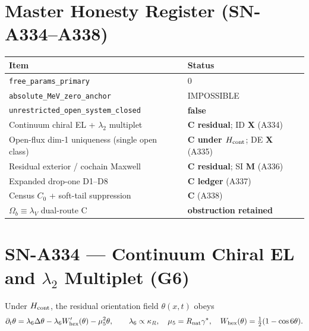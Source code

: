 
\section*{Master Honesty Register (SN-A334--A338)}
\begin{center}
\begin{tabular}{@{}p{7.6cm}p{5.0cm}@{}}
\toprule
\textbf{Item} & \textbf{Status} \\
\midrule
\texttt{free\_params\_primary} & $0$ \\
\texttt{absolute\_MeV\_zero\_anchor} & IMPOSSIBLE \\
\texttt{unrestricted\_open\_system\_closed} & \textbf{false} \\
Continuum chiral EL + $\lambda_2$ multiplet & \textbf{C residual}; ID \textbf{X} (A334) \\
Open-flux dim-1 uniqueness (single open class) & \textbf{C under $H_{\rm cont}$}; DE \textbf{X} (A335) \\
Residual exterior / cochain Maxwell & \textbf{C residual}; SI \textbf{M} (A336) \\
Expanded drop-one D1--D8 & \textbf{C ledger} (A337) \\
Census $C_0$ + soft-tail suppression & \textbf{C} (A338) \\
$\Omega_b\equiv\lambda_V$ dual-route C & \textbf{obstruction retained} \\
\bottomrule
\end{tabular}
\end{center}

\section{SN-A334 --- Continuum Chiral EL and $\lambda_2$ Multiplet (G6)}
\label{sec:SN-A334}

\begin{definition}
\label{def:A334-theta}
Under $H_{\rm cont}$, the residual orientation field $\theta(x,t)$ obeys
\begin{equation}
\partial_t\theta
=
\lambda_6\Delta\theta
-
\lambda_6 W_{\mathrm{hex}}'(\theta)
-
\mu_5^2\theta,
\qquad
\lambda_6\propto\kappa_R,
\quad
\mu_5=R_{\rm nat}\gamma^\star,
\quad
W_{\mathrm{hex}}(\theta)=\tfrac12(1-\cos 6\theta).
\end{equation}
\end{definition}

